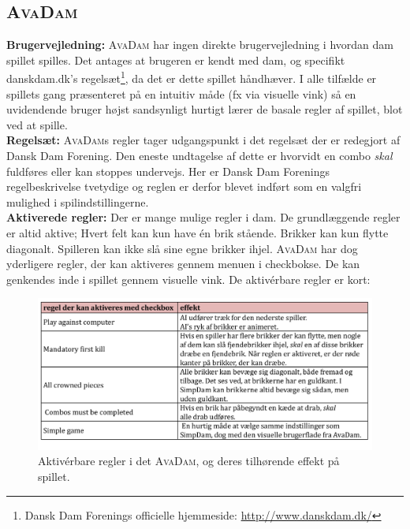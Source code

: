 \subsection{\textsc{AvaDam}} \label{sec:designAvaDam}
\textbf{Brugervejledning:} \textsc{AvaDam} har ingen direkte brugervejledning i hvordan dam spillet spilles. Det antages at brugeren er kendt med dam, og specifikt danskdam.dk's regelsæt\footnote{Dansk Dam Forenings officielle hjemmeside: \url{http://www.danskdam.dk/}}, da det er dette spillet håndhæver. I alle tilfælde er spillets gang præsenteret på en intuitiv måde (fx via visuelle vink) så en uvidendende bruger højst sandsynligt hurtigt lærer de basale regler af spillet, blot ved at spille. \\

\textbf{Regelsæt:} \textsc{AvaDam}s regler tager udgangspunkt i det regelsæt der er redegjort af Dansk Dam Forening. Den eneste undtagelse af dette er hvorvidt en combo \textit{skal} fuldføres eller kan stoppes undervejs. Her er Dansk Dam Forenings regelbeskrivelse tvetydige og reglen er derfor blevet indført som en valgfri mulighed i spilindstillingerne.  \\

\textbf{Aktiverede regler:} Der er mange mulige regler i dam. De grundlæggende regler er altid aktive; Hvert felt kan kun have én brik stående. Brikker kan kun flytte diagonalt. Spilleren kan ikke slå sine egne brikker ihjel. \textsc{AvaDam} har dog yderligere regler, der kan aktiveres gennem menuen i checkbokse. De kan genkendes inde i spillet gennem visuelle vink. De aktivérbare regler er kort:

\begin{figure}[H]
    \centering
    \includegraphics[width = 1.0 \textwidth]{Figurer/aktiveredeRegler.pdf}
    \caption{Aktivérbare regler i det \textsc{AvaDam}, og deres tilhørende effekt på spillet.}
    \label{fig:aktiveredeRegler}
\end{figure}

